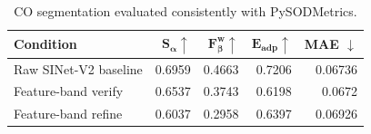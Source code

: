 \begin{table}[htbp]
\centering
\caption{CO segmentation evaluated consistently with PySODMetrics.}
\label{tab:pysod}
\small
\begin{tabular}{lrrrr}
\toprule
\textbf{Condition} & $\boldsymbol{S_\alpha\uparrow}$ & $\boldsymbol{F_\beta^w\uparrow}$ & $\boldsymbol{E_{adp}\uparrow}$ & \textbf{MAE $\downarrow$} \\
\midrule
Raw SINet-V2 baseline & 0.6959 & 0.4663 & 0.7206 & 0.06736 \\
Feature-band verify & 0.6537 & 0.3743 & 0.6198 & 0.0672 \\
Feature-band refine & 0.6037 & 0.2958 & 0.6397 & 0.06926 \\
\bottomrule
\end{tabular}

\par{}
\end{table}
